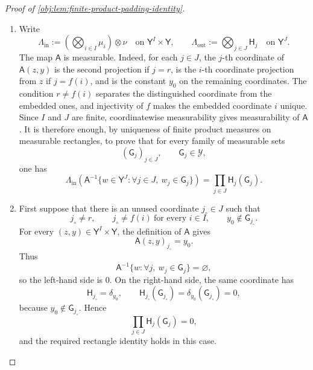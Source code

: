 \begin{proof}[Proof of \cref{obj:lem:finite-product-padding-identity}]
\begin{enumerate}
\item
Write
\[
\Lambda_{\mathrm{in}}
  :=\left(\bigotimes_{i\in I}\mu_i\right)\otimes \nu
  \quad\text{on }\mathsf Y^I\times\mathsf Y,
\qquad
\Lambda_{\mathrm{out}}
  :=\bigotimes_{j\in J}\mathsf H_j
  \quad\text{on }\mathsf Y^J .
\]
The map \(\mathsf A\) is measurable. Indeed, for each \(j\in J\), the \(j\)-th coordinate of
\(\mathsf A(z,y)\) is the second projection if \(j=r\), is the \(i\)-th coordinate projection
from \(z\) if \(j=f(i)\), and is the constant \(y_0\) on the remaining coordinates. The condition
\(r\ne f(i)\) separates the distinguished coordinate from the embedded ones, and injectivity of
\(f\) makes the embedded coordinate \(i\) unique. Since \(I\) and \(J\) are finite, coordinatewise
measurability gives measurability of \(\mathsf A\). It is therefore enough, by uniqueness of finite
product measures on measurable rectangles, to prove that for every family of measurable sets
\[
(\mathsf G_j)_{j\in J},
\qquad
\mathsf G_j\in\mathcal Y ,
\]
one has
\[
\Lambda_{\mathrm{in}}\!\left(\mathsf A^{-1}
  \{w\in\mathsf Y^J:\forall j\in J,\ w_j\in\mathsf G_j\}\right)
=
\prod_{j\in J}\mathsf H_j(\mathsf G_j).
\]

\item
First suppose that there is an unused coordinate \(j_\circ\in J\) such that
\[
j_\circ\ne r,\qquad
j_\circ\ne f(i)\ \text{for every }i\in I,
\qquad
y_0\notin \mathsf G_{j_\circ}.
\]
For every \((z,y)\in\mathsf Y^I\times\mathsf Y\), the definition of \(\mathsf A\) gives
\[
\mathsf A(z,y)_{j_\circ}=y_0.
\]
Thus
\[
\mathsf A^{-1}\{w:\forall j,\ w_j\in\mathsf G_j\}=\varnothing,
\]
so the left-hand side is \(0\). On the right-hand side, the same coordinate has
\[
\mathsf H_{j_\circ}=\delta_{y_0},
\qquad
\mathsf H_{j_\circ}(\mathsf G_{j_\circ})
  =\delta_{y_0}(\mathsf G_{j_\circ})=0,
\]
because \(y_0\notin\mathsf G_{j_\circ}\). Hence
\[
\prod_{j\in J}\mathsf H_j(\mathsf G_j)=0,
\]
and the required rectangle identity holds in this case.


\end{enumerate}
\end{proof}
